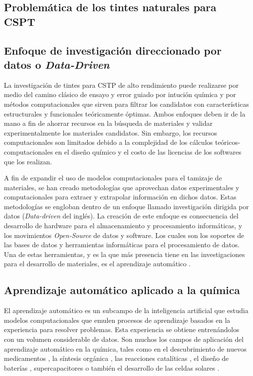  \subsection{Problemática de los tintes naturales para CSPT}



\subsection{Enfoque de investigación direccionado por datos o \textit{Data-Driven}}

La investigación de tintes para CSTP de alto rendimiento puede realizarse por medio del camino clásico de ensayo y error guiado por intución química y por métodos computacionales que sirven para filtrar los candidatos con características estructurales y funcionales teóricamente óptimas. Ambos enfoques deben ir de la mano a fin de ahorrar recursos en la búsqueda de materiales y validar experimentalmente los materiales candidatos. Sin embargo, los recursos computacionales son limitados debido a la complejidad de los cálculos teóricos-computacionales en el diseño químico y el costo de las licencias de los softwares que los realizan.

A fin de expandir el uso de modelos computacionales para el tamizaje de materiales, se han creado metodologías que aprovechan datos experimentales y computacionales para extraer y extrapolar información en dichos datos. Estas metodologías se engloban dentro de un enfoque llamado investigación dirigida por datos (\textit{Data-driven} del inglés). La creación de este enfoque es consecuencia del desarrollo de hardware para el almacenamiento y procesamiento informáticas, y los movimientos \textit{Open-Source} de datos y software. Los cuales son los soportes de las bases de datos y herramientas informáticas para el procesamiento de datos. Una de estas herramientas, y es la que más presencia tiene en las investigaciones para el desarrollo de materiales, es el aprendizaje automático \cite{himanen2019data}. 

\subsection{Aprendizaje automático aplicado a la química}

El aprendizaje automático es un subcampo de la inteligencia artificial que estudia modelos computacionales que emulen procesos de aprendizaje basados en la experiencia para resolver problemas. Esta experiencia se obtiene entrenándolos con un volumen considerable de datos. Son muchos los campos de aplicación del aprendizaje automático en la química, tales como en el descubrimiento de nuevos medicamentos \cite{vamathevan2019applications}, la síntesis orgánica \cite{maryasin2018machine}, las reacciones catalíticas \cite{kitchin2018machine}, el diseño de baterías \cite{liu2020machine}, supercapacitores \cite{zhu2018artificial} o también el desarrollo de las celdas solares \cite{mahmood2021machine}. 

